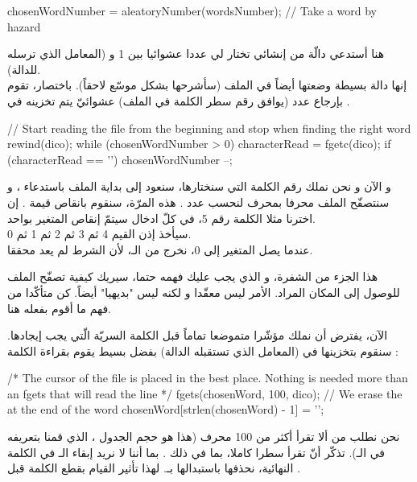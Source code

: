 \begin{Csource}
chosenWordNumber = aleatoryNumber(wordsNumber); // Take a word by hazard
\end{Csource}

هنا أستدعي دالّة من إنشائي تختار لي عددا عشوائيا بين 1 و
(المعامل الذي ترسله للدالة).\\
إنها دالة بسيطة وضعتها أيضاً في الملف
(سأشرحها بشكل موسّع لاحقاً). باختصار، تقوم بإرجاع عدد (يوافق رقم سطر الكلمة في الملف) عشوائيّ يتم تخزينه في
.

\begin{Csource}
// Start reading the file from the beginning and stop when finding the right word
rewind(dico);
while (chosenWordNumber > 0)
{
	characterRead = fgetc(dico);
	if (characterRead == '\n')
    	 chosenWordNumber --;
}
\end{Csource}

و الآن و نحن نملك رقم الكلمة التي سنختارها، سنعود إلى بداية الملف باستدعاء
،
و سنتصفّح الملف محرفا بمحرف لنحسب عدد
.
هذه المرّة، سنقوم بانقاص قيمة
.
إن اخترنا مثلا الكلمة رقم 5، في كلّ ادخال سيتمّ إنقاص المتغير
بواحد.\\
سيأخذ إذن القيم 4 ثم 3 ثم 2 ثم 1 ثم 0. \\
عندما يصل المتغير إلى 0، نخرج من الـ،
لأن الشرط
لم يعد محققا.

هذا الجزء من الشفرة، و الذي يجب عليك فهمه حتما، سيريك كيفية تصفّح الملف للوصول إلى المكان المراد. الأمر ليس معقّدا و لكنه ليس "بديهيا" أيضاً. كن متأكّدا من فهم ما أقوم بفعله هنا.

الآن، يفترض أن نملك مؤشّرا متموضعا تماماً قبل الكلمة السريّة الّتي يجب إيجادها.
سنقوم بتخزينها في
(المعامل الذي تستقبله الدالة) بفضل
بسيط يقوم بقراءة الكلمة :

\begin{Csource}
/* The cursor of the file is placed in the best place.
Nothing is needed more than an fgets that will read the line */
fgets(chosenWord, 100, dico);
// We erase the \n at the end of the word
chosenWord[strlen(chosenWord) - 1] = '\0';
\end{Csource}

نحن نطلب من
ألا تقرأ أكثر من 100 محرف (هذا هو حجم الجدول
،
الذي قمنا بتعريفه في الـ).
تذكّر أنّ
تقرأ سطرا كاملا، بما في ذلك
.
بما أننا لا نريد إبقاء الـ
في الكلمة النهائية، نحذفها باستبدالها بـ.
لهذا تأثير القيام بقطع الكلمة قبل
.

